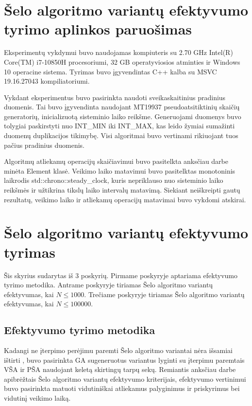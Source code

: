 \documentclass{VUMIFInfKursinis}
\begin{document}
\section{Šelo algoritmo variantų efektyvumo tyrimo aplinkos paruošimas}

Eksperimentų vykdymui buvo naudojamas kompiuteris su 2.70 GHz Intel(R) Core(TM) i7-10850H procesoriumi,
32 GB operatyviosios atminties ir Windows 10 operacine sistema.
Tyrimas buvo įgyvendintas C++ kalba su MSVC 19.16.27043 kompiliatoriumi.

Vykdant eksperimentus buvo pasirinkta naudoti sveikaskaitinius pradinius duomenis.
Tai buvo įgyvendinta naudojant MT19937 pseudoatsitiktinių skaičių generatorių, inicializuotą sisteminio laiko reikšme.
Generuojami duomenys buvo tolygiai paskirstyti nuo INT\_MIN iki INT\_MAX, kas leido žymiai sumažinti duomenų duplikacijos tikimybę.
Visi algoritmai buvo vertinami rikiuojant tuos pačius pradinius duomenis.

Algoritmų atliekamų operacijų skaičiavimui buvo pasitelkta anksčiau darbe minėta Element klasė.
Veikimo laiko matavimui buvo pasitelktas monotoninis laikrodis std::chrono::steady\_clock, kuris nepriklauso nuo sisteminio laiko reikšmės
ir užtikrina tikslų laiko intervalų matavimą.
Siekiant neiškreipti gautų rezultatų, veikimo laiko ir atliekamų operacijų matavimai buvo vykdomi atskirai.

\section{Šelo algoritmo variantų efektyvumo tyrimas}

Šis skyrius sudarytas iš 3 poskyrių.
Pirmame poskyryje aptariama efektyvumo tyrimo metodika.
Antrame poskyryje tiriamas Šelo algoritmo variantų efektyvumas, kai $N \leq 1000$.
Trečiame poskyryje tiriamas Šelo algoritmo variantų efektyvumas, kai $N \leq 100000$.

\subsection{Efektyvumo tyrimo metodika}

Kadangi ne įterpimo perėjimu paremti Šelo algoritmo variantai nėra išsamiai ištirti \cite{brejova2001analyzing},
buvo pasirinkta GA sugeneruotus variantus lyginti su įterpimu paremtais VŠA ir PŠA naudojant keletą skirtingų tarpų sekų.
Remiantis anksčiau darbe apibrėžtais Šelo algoritmo variantų efektyvumo kriterijais,
efektyvumo vertinimui buvo pasirinkta matuoti vidutiniškai atliekamus palyginimus ir priskyrimus bei vidutinį veikimo laiką.  
\end{document}
